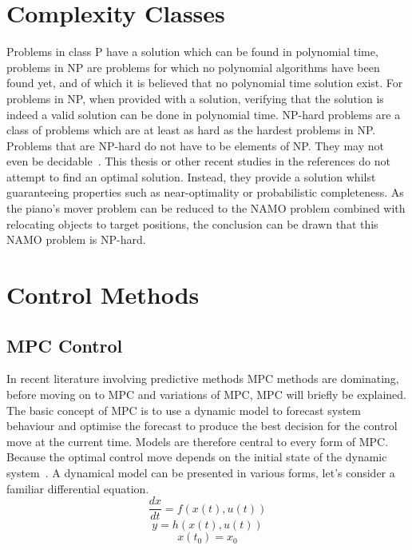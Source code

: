\chapter{Complexity Classes}%
\label{chap:appendix_complexity_classes}
Problems in class P have a solution which can be found in polynomial time, problems in \ac{NP} are problems for which no polynomial algorithms have been found yet, and of which it is believed that no polynomial time solution exist. For problems in \ac{NP}, when provided with a solution, verifying that the solution is indeed a valid solution can be done in polynomial time. \ac{NP-hard} problems are a class of problems which are at least as hard as the hardest problems in \ac{NP}. Problems that are \ac{NP-hard} do not have to be elements of NP. They may not even be decidable~\cite{pokharel_computational_2020}. This thesis or other recent studies in the references do not attempt to find an optimal solution. Instead, they provide a solution whilst guaranteeing properties such as near-optimality or probabilistic completeness. As the piano's mover problem can be reduced to the \ac{NAMO} problem combined with relocating objects to target positions, the conclusion can be drawn that this \ac{NAMO} problem is \ac{NP-hard}.\bs

\chapter{Control Methods}%
\label{chap:appendix_control_methods}

\section{\ac{MPC} Control}
\label{sec:appendix_mpc}
In recent literature involving predictive methods \acf{MPC} methods are dominating, before moving on to \ac{MPC} and variations of \ac{MPC}, \ac{MPC} will briefly be explained.  The basic concept of \ac{MPC} is to use a dynamic model to forecast system behaviour and optimise the forecast to produce the best decision for the control move at the current time. Models are therefore central to every form of \ac{MPC}. Because the optimal control move depends on the initial state of the dynamic system~\cite{rawlings_model_2020}. A dynamical model can be presented in various forms, let's consider a familiar differential equation. 
$$ \frac{dx}{dt} = f(x(t), u(t)) $$
$$ y = h(x(t), u(t)) $$ 
$$ x(t_0) = x_0 $$

